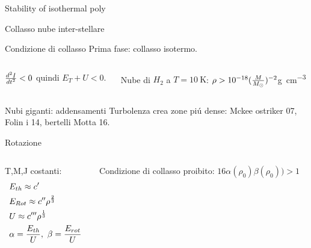 \begin{frame}{Stability of isothermal poly}
\begin{frame}{Collasso nube inter-stellare}

\begin{block}{Condizione di collasso}
Prima fase: collasso isotermo.
\begin{columns}
\begin{column}{0.5\textwidth}
$\TtwoDy{t}{I}<0$ quindi $E_T+U<0$.
\end{column}
\begin{column}{0.5\textwidth}
Nube di $H_2$ a $T=\SI{10}{\kelvin}$:
$\rho>\num{e-18}(\frac{M}{\msun{}})^{-2}$\si{\gram\per\cubic\cm}
\end{column}
\end{columns}
\end{block}
\begin{block}{Nubi giganti: addensamenti}
Turbolenza crea zone pi\'u dense: Mckee ostriker 07, Folin i 14, bertelli Motta 16.
\end{block}
\begin{block}{Rotazione}
\begin{columns}[T]
\begin{column}{0.5\textwidth}
T,M,J costanti:
\begin{align*}
&E_{th}\approx c'\\
&E_{Rot}\approx c''\rho\expy{\frac{2}{3}}\\
&U\approx c'''\rho\expy{\frac{1}{3}}\\
&\alpha=\frac{E_{th}}{U},\ \beta=\frac{E_{rot}}{U}
\end{align*}
\end{column}
\begin{column}{0.5\textwidth}
Condizione di collasso proibito: $16\alpha(\rho_0)\beta(\rho_0))>1$
\end{column}
\end{columns}
\end{block}
\end{frame}


\end{frame}
